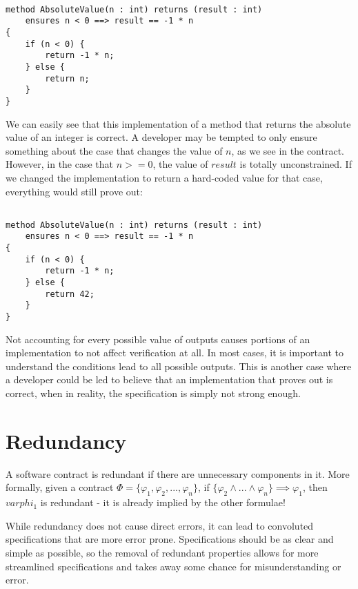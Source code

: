 \documentclass{article}
\begin{document}
\begin{lstlisting}

method AbsoluteValue(n : int) returns (result : int)
    ensures n < 0 ==> result == -1 * n
{
    if (n < 0) {
        return -1 * n;
    } else {
        return n;
    }
}

\end{lstlisting}

We can easily see that this implementation of a method that returns the absolute value of an integer is correct. A developer may be
tempted to only ensure something about the case that changes the value of \(n\), as we see in the contract. However, in the case that \(n >= 0\), the value
of \(result\) is totally unconstrained. If we changed the implementation to return a hard-coded value for that case, everything
would still prove out:

\begin{lstlisting}

method AbsoluteValue(n : int) returns (result : int)
    ensures n < 0 ==> result == -1 * n
{
    if (n < 0) {
        return -1 * n;
    } else {
        return 42;
    }
}

\end{lstlisting}

Not accounting for every possible value of outputs causes portions of an implementation to not affect verification at all. In
most cases, it is important to understand the conditions lead to all possible outputs. This is another case where a
developer could be led to believe that an implementation that proves out is correct, when in reality, the specification is
simply not strong enough.

\section{Redundancy}

A software contract is redundant if there are unnecessary components in it. More formally, given a contract
\(\Phi = \{\varphi_{1}, \varphi_{2}, ..., \varphi_{n}\}\), if \(\{\varphi_{2} \land ... \land \varphi_{n}\} \implies \varphi_{1}\), then
\(varphi_{1}\) is redundant - it is already implied by the other formulae!

While redundancy does not cause direct errors, it can lead to convoluted specifications that are more error prone. Specifications should be as
clear and simple as possible, so the removal of redundant properties allows for more streamlined specifications and takes away some chance
for misunderstanding or error.
\end{document}
